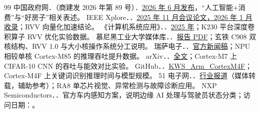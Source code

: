 \begin{thebibliography}{99}
 中国政府网．\SourceAIConsumptionPolicyName{}（商建发 2026 年第 89 号）．\href{\SourceAIConsumptionPolicyURL}{2026 年 6 月发布}，“人工智能+消费”与“好房子”相关表述。
 IEEE Xplore．\SourceRVVCNNEvalName{}．\href{\SourceRVVCNNEvalURL}{2025 年 11 月会议论文，2026 年 1 月收录}；RVV 向量化加速结论。
 《计算机系统应用》．\SourceKCanmvPyTorchName{}．\href{\SourceKCanmvPyTorchURL}{2025 年}；K230 平台深度卷积算子 RVV 优化实验数据。
 慕尼黑工业大学媒体库．\SourceKCanmvReportName{}．\href{\SourceKCanmvReportURL}{报告 PDF}；玄铁 C908 双核结构、RVV 1.0 与大小核操作系统分工说明。
 瑞萨电子．\SourceRAResasPName{}．\href{\SourceRAResasPURL}{官方新闻稿}；NPU 相较单核 Cortex-M85 的推理吞吐提升数据。
 arXiv．\SourceCMSISNNName{}．\href{\SourceCMSISNNURL}{全文}；Cortex-M7 上 CIFAR-10 CNN 的吞吐与能效对比实验。
 GitHub．\SourceTinyMLKWSName{}．\href{\SourceTinyMLKWSURL}{KWS\_Arm\_CortexM4F}；Cortex-M4F 上关键词识别推理时间与模型规模。
 51 电子网．\SourceRAScenarioName{}．\href{\SourceRAScenarioURL}{行业报道}（媒体转载，辅助参考）；RA8 单芯片视觉、异常检测与故障诊断应用。
 NXP Semiconductors．\href{\SourceCabinAIURL}{\SourceCabinAIName{}}．官方车内感知方案，说明边缘 AI 处理与驾驶员状态分类；访问日期：\SourceCabinAIAccessDate{}。
\end{thebibliography}
